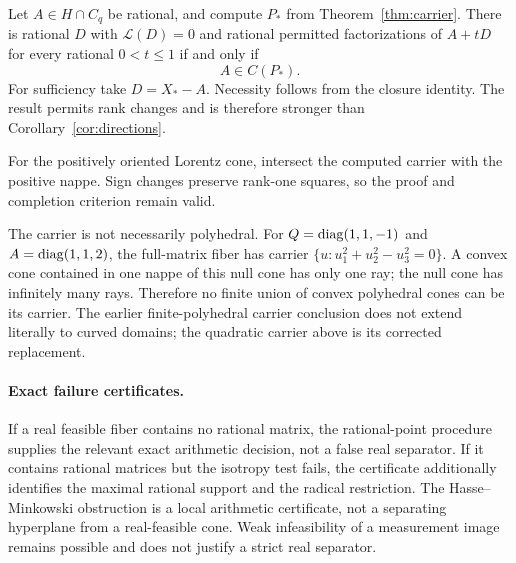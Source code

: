 \begin{corollary}
Let $A\in H\cap C_q$ be rational, and compute $P_*$ from Theorem~\ref{thm:carrier}. There is rational $D$ with $\mathcal L(D)=0$ and rational permitted factorizations of $A+tD$ for every rational $0<t\leq1$ if and only if
\[
 A\in C(P_*).
\]
For sufficiency take $D=X_*-A$. Necessity follows from the closure identity. The result permits rank changes and is therefore stronger than Corollary~\ref{cor:directions}.
\end{corollary}

For the positively oriented Lorentz cone, intersect the computed carrier with the positive nappe. Sign changes preserve rank-one squares, so the proof and completion criterion remain valid.

The carrier is not necessarily polyhedral. For $Q=\operatorname{diag}(1,1,-1)$ and $A=\operatorname{diag}(1,1,2)$, the full-matrix fiber has carrier $\{u:u_1^2+u_2^2-u_3^2=0\}$. A convex cone contained in one nappe of this null cone has only one ray; the null cone has infinitely many rays. Therefore no finite union of convex polyhedral cones can be its carrier. The earlier finite-polyhedral carrier conclusion does not extend literally to curved domains; the quadratic carrier above is its corrected replacement.

\paragraph{Exact failure certificates.}
If a real feasible fiber contains no rational matrix, the rational-point procedure supplies the relevant exact arithmetic decision, not a false real separator. If it contains rational matrices but the isotropy test fails, the certificate additionally identifies the maximal rational support and the radical restriction. The Hasse--Minkowski obstruction is a local arithmetic certificate, not a separating hyperplane from a real-feasible cone. Weak infeasibility of a measurement image remains possible and does not justify a strict real separator.
